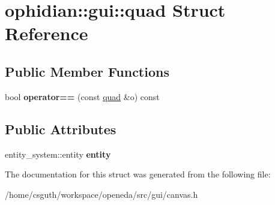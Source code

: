 \hypertarget{structophidian_1_1gui_1_1quad}{\section{ophidian\-:\-:gui\-:\-:quad Struct Reference}
\label{structophidian_1_1gui_1_1quad}
}
\subsection*{Public Member Functions}
\begin{DoxyCompactItemize}
\item 
\hypertarget{structophidian_1_1gui_1_1quad_a7f003b5e0fa834f1d089adf0d215c3f1}{bool {\bfseries operator==} (const \hyperlink{structophidian_1_1gui_1_1quad}{quad} \&o) const }\label{structophidian_1_1gui_1_1quad_a7f003b5e0fa834f1d089adf0d215c3f1}

\end{DoxyCompactItemize}
\subsection*{Public Attributes}
\begin{DoxyCompactItemize}
\item 
\hypertarget{structophidian_1_1gui_1_1quad_abfd7f78c0f9e08cdedf3091f1bc21cb0}{entity\-\_\-system\-::entity {\bfseries entity}}\label{structophidian_1_1gui_1_1quad_abfd7f78c0f9e08cdedf3091f1bc21cb0}

\end{DoxyCompactItemize}


The documentation for this struct was generated from the following file\-:\begin{DoxyCompactItemize}
\item 
/home/csguth/workspace/openeda/src/gui/canvas.\-h\end{DoxyCompactItemize}
